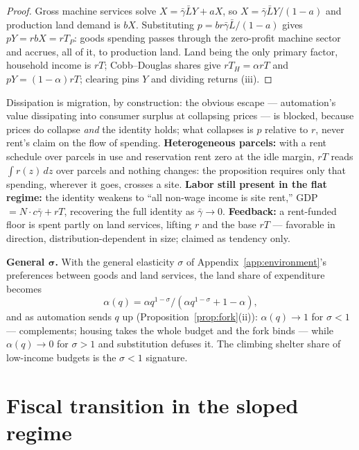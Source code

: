 \documentclass[12pt]{article}
\theoremstyle{plain}
\begin{document}
\begin{proof}
Gross machine services solve $X = \bar{\gamma}\bar{L}Y + aX$, so $X = \bar{\gamma}\bar{L}Y/(1-a)$ and production land demand is $bX$. Substituting $p = br\bar{\gamma}\bar{L}/(1-a)$ gives $pY = r bX = rT_P$: goods spending passes through the zero-profit machine sector and accrues, all of it, to production land. Land being the only primary factor, household income is $rT$; Cobb--Douglas shares give $rT_H = \alpha rT$ and $pY = (1-\alpha )rT$; clearing pins $Y$ and dividing returns (iii).
\end{proof}

Dissipation is migration, by construction: the obvious escape --- automation's value dissipating into consumer surplus at collapsing prices --- is blocked, because prices do collapse \emph{and} the identity holds; what collapses is $p$ relative to $r$, never rent's claim on the flow of spending. \textbf{Heterogeneous parcels:} with a rent schedule over parcels in use and reservation rent zero at the idle margin, $rT$ reads $\int r(z)\,dz$ over parcels and nothing changes: the proposition requires only that spending, wherever it goes, crosses a site. \textbf{Labor still present in the flat regime:} the identity weakens to ``all non-wage income is site rent,'' GDP $= N\cdot c\bar{\gamma} + rT$, recovering the full identity as $\bar{\gamma} \to 0$. \textbf{Feedback:} a rent-funded floor is spent partly on land services, lifting $r$ and the base $rT$ --- favorable in direction, distribution-dependent in size; claimed as tendency only.

\textbf{General $\bm{\sigma}$.} With the general elasticity $\sigma$ of Appendix~\ref{app:environment}'s preferences between goods and land services, the land share of expenditure becomes
\begin{equation}\label{eq:ces-share}
\alpha (q) = \alpha q^{1-\sigma} / (\alpha q^{1-\sigma} + 1 - \alpha ),
\end{equation}
and as automation sends $q$ up (Proposition~\ref{prop:fork}(ii)): $\alpha (q) \to 1$ for $\sigma < 1$ --- complements; housing takes the whole budget and the fork binds --- while $\alpha (q) \to 0$ for $\sigma > 1$ and substitution defuses it. The climbing shelter share of low-income budgets is the $\sigma < 1$ signature.

\section{Fiscal transition in the sloped regime}\label{app:fiscal}
\end{document}
